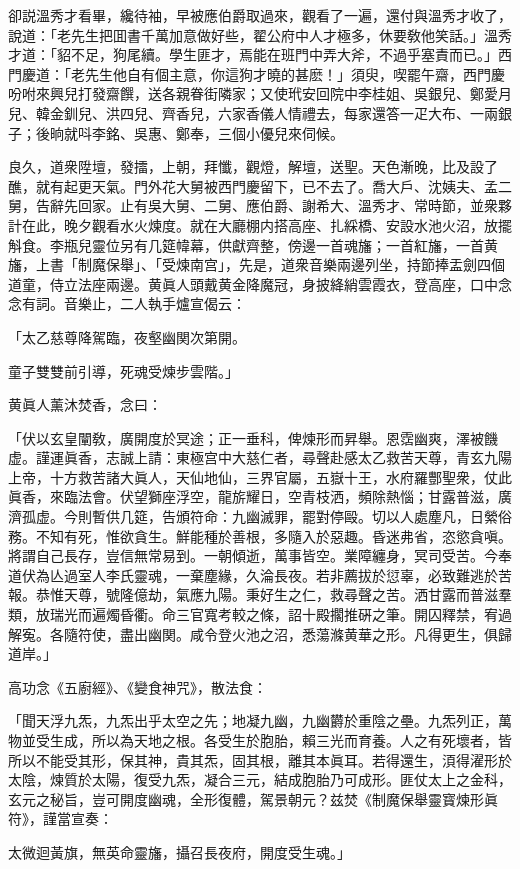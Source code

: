 卻説溫秀才看畢，纔待袖，早被應伯爵取過來，觀看了一遍，還付與溫秀才收了，說道：「老先生把囬書千萬加意做好些，翟公府中人才極多，休要敎他笑話。」溫秀才道：「貂不足，狗尾續。學生匪才，焉能在班門中弄大斧，不過乎塞責而已。」西門慶道：「老先生他自有個主意，你這狗才曉的甚麽！」須臾，喫罷午齋，西門慶吩咐來興兒打發齋饌，送各親眷街隣家；又使玳安回院中李桂姐、吳銀兒、鄭愛月兒、韓金釧兒、洪四兒、齊香兒，六家香儀人情禮去，每家還答一疋大布、一兩銀子；後晌就呌李銘、吳惠、鄭奉，三個小優兒來伺候。

良久，道衆陞壇，發擂，上朝，拜懺，觀燈，解壇，送聖。天色漸晚，比及設了醮，就有起更天氣。門外花大舅被西門慶留下，已不去了。喬大戶、沈姨夫、孟二舅，告辭先回家。止有吳大舅、二舅、應伯爵、謝希大、溫秀才、常時節，並衆夥計在此，晚夕觀看水火煉度。就在大廳棚内搭高座、扎綵橋、安設水池火沼，放擺斛食。李瓶兒靈位另有几筵幃幕，供獻齊整，傍邊一首魂旛；一首紅旛，一首黄旛，上書「制魔保舉」、「受煉南宫」，先是，道衆音樂兩邊列坐，持節捧盂劍四個道童，侍立法座兩邊。黄眞人頭戴黄金降魔冠，身披絳綃雲霞衣，登高座，口中念念有詞。音樂止，二人執手爐宣偈云：

\begin{myquote}
「太乙慈尊降駕臨，夜壑幽関次第開。

童子雙雙前引導，死魂受煉步雲階。」
\end{myquote}

黄眞人薰沐焚香，念曰：

\begin{myquote}[\markfont]
「伏以玄皇闡敎，廣開度於冥途；正一垂科，俾煉形而昇舉。恩霑幽爽，澤被饑虚。謹運眞香，志誠上請：東極宫中大慈仁者，尋聲赴感太乙救苦天尊，青玄九陽上帝，十方救苦諸大眞人，天仙地仙，三界官屬，五嶽十王，水府羅酆聖衆，仗此眞香，來臨法會。伏望獅座浮空，龍旂耀日，空青枝洒，頻除熱惱；甘露普滋，廣濟孤虚。今則暫供几筵，告頒符命：九幽滅罪，罷對停毆。切以人處塵凡，日縈俗務。不知有死，惟欲貪生。鮮能種於善根，多隨入於惡趣。昏迷弗省，恣慾貪嗔。將謂自己長存，豈信無常易到。一朝傾逝，萬事皆空。業障纏身，冥司受苦。今奉道伏為亾過室人李氏靈魂，一棄塵緣，久淪長夜。若非薦拔於愆辜，必致難逃於苦報。恭惟天尊，號隆億劫，氣應九陽。秉好生之仁，救尋聲之苦。洒甘露而普滋羣類，放瑞光而遍燭昏衢。命三官寬考較之條，詔十殿擱推硏之筆。開囚釋禁，宥過解寃。各隨符使，盡出幽関。咸令登火池之沼，悉蕩滌黄華之形。凡得更生，俱歸道岸。」
\end{myquote}

高功念《五廚經》、《變食神咒》，散法食：

\begin{myquote}[\markfont]
「聞天浮九炁，九炁出乎太空之先；地凝九幽，九幽欝於重陰之壘。九炁列正，萬物並受生成，所以為天地之根。各受生於胞胎，賴三光而育養。人之有死壞者，皆所以不能受其形，保其神，貴其炁，固其根，離其本眞耳。若得還生，湏得濯形於太陰，煉質於太陽，復受九炁，凝合三元，結成胞胎乃可成形。匪仗太上之金科，玄元之秘旨，豈可開度幽魂，全形復體，駕景朝元？兹焚《制魔保舉靈寳煉形眞符》，謹當宣奏：

太微迴黃旗，無英命靈旛，攝召長夜府，開度受生魂。」
\end{myquote}

